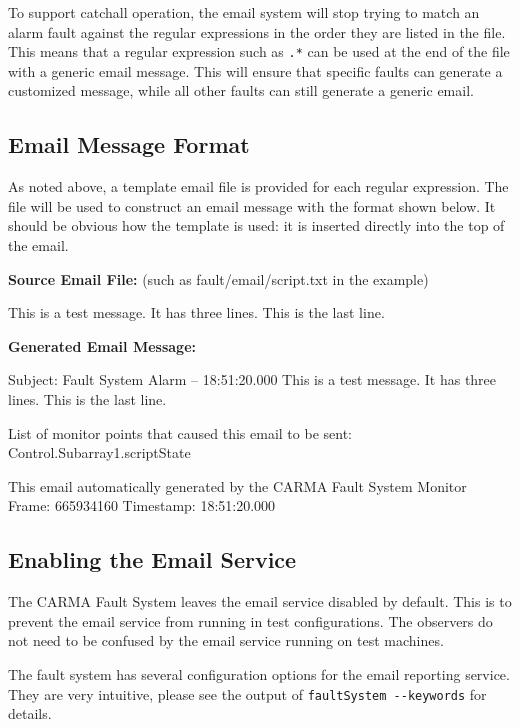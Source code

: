 \documentclass[letterpaper,12pt,oneside,pdftex]{article}
\newcommand{\shadebox}[1]{\fcolorbox{black}{shade}{\begin{minipage}{\textwidth}#1\end{minipage}}}
\begin{document}
To support catchall operation, the email system will stop trying to match an
alarm fault against the regular expressions in the order they are listed in the
file. This means that a regular expression such as \verb|.*| can be used at the
end of the file with a generic email message. This will ensure that specific
faults can generate a customized message, while all other faults can still
generate a generic email.

\subsection{Email Message Format}

As noted above, a template email file is provided for each regular expression.
The file will be used to construct an email message with the format shown below.
It should be obvious how the template is used: it is inserted directly into the
top of the email.

\textbf{Source Email File:} (such as fault/email/script.txt in the example) \\
\begin{verbbox}
This is a test message.
It has three lines.
This is the last line.
\end{verbbox}
\shadebox{\theverbbox}

\textbf{Generated Email Message:} \\
\begin{verbbox}
Subject: Fault System Alarm -- 18:51:20.000
This is a test message.
It has three lines.
This is the last line.


List of monitor points that caused this email to be sent:
Control.Subarray1.scriptState


This email automatically generated by the CARMA Fault System
Monitor Frame: 665934160
Timestamp: 18:51:20.000
\end{verbbox}
\shadebox{\theverbbox}

\subsection{Enabling the Email Service}

The CARMA Fault System leaves the email service disabled by default. This is to
prevent the email service from running in test configurations. The observers do
not need to be confused by the email service running on test machines.

The fault system has several configuration options for the email reporting
service. They are very intuitive, please see the output of
\verb|faultSystem --keywords| for details.
\end{document}
